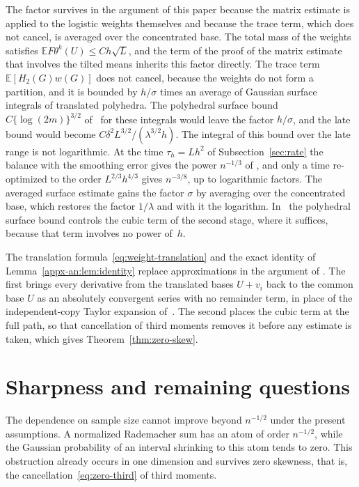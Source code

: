 \documentclass[11pt,letterpaper]{article}
\newif\ifshowlin
\newcommand{\lin}[1]{\ifshowlin{\color{revblue}%
\hypersetup{linkcolor=revblue,citecolor=revblue,urlcolor=revblue}#1}\else#1\fi}
\newif\ifshowskill
\newcommand{\skl}[1]{\ifshowskill{\color{revblue}%
\hypersetup{linkcolor=revblue,citecolor=revblue,urlcolor=revblue}#1}\else#1\fi}
\newif\ifshownat
\newcommand{\nat}[1]{\ifshownat{\color{revblue}%
\hypersetup{linkcolor=revblue,citecolor=revblue,urlcolor=revblue}#1}\else#1\fi}
\theoremstyle{remark}
\newcommand{\E}{\mathbb E}
\newcommand{\Hh}{H_2}
\begin{document}
{\skl{The factor survives in \nat{the argument of this paper} because the matrix estimate is
applied to the logistic weights themselves and because the trace term,
which does not cancel, is averaged over the concentrated base. The total
mass of the weights satisfies} \(\E F\theta^k(U)\le Ch\sqrt L\), and the term of \skl{the
proof of the matrix estimate} that involves
the tilted means inherits this factor directly. \skl{The} trace term
\(\E[\Hh(G)w(G)]\) does not cancel, because the weights do not form a
partition, and it is bounded by \(h/\sigma\) times an average of Gaussian
surface integrals of translated polyhedra. \nat{The polyhedral surface bound} \(C\{\log(2m)\}^{3/2}\) \nat{of}~\cite[Proposition~4]{GaoZhang}
for these integrals would leave the factor \(h/\sigma\), and the late
bound would become \(C\delta^2L^{3/2}/(\lambda^{3/2}h)\). The integral of
this bound \skl{over the late range} is not logarithmic\skl{. At the time
\(\tau_h=Lh^2\) of Subsection~\ref{sec:rate} the balance with the
smoothing error gives the power \(n^{-1/3}\) of \nat{\cite{GaoZhang}}, and only a
time re-optimized to the order \(L^{2/3}h^{4/3}\) gives \(n^{-3/8}\), up to
logarithmic factors.} The averaged surface estimate gains the factor \(\sigma\) by averaging over
the concentrated base, which restores the factor \(1/\lambda\) and with
it the logarithm. \nat{In~\cite[eq.~(19)]{GaoZhang} the polyhedral surface bound controls the cubic term of the second stage}, where it suffices,
because that term involves no power of~\(h\).

\lin{The translation formula~\eqref{eq:weight-translation} and the
exact identity of Lemma~\ref{appx-an:lem:identity} replace
approximations in the argument of \nat{\cite{GaoZhang}}. The first brings every
derivative from the translated bases \(U+v_i\) back to the common base
\(U\) as an absolutely convergent series with no remainder term, in place of \nat{the independent-copy Taylor expansion of}~\cite[Lemmas~19 and~23]{GaoZhang}. The second places the cubic
term at the full path, so that cancellation of third moments removes it
before any estimate is taken, which gives
Theorem~\ref{thm:zero-skew}.}}


\section{Sharpness and remaining questions}\label{opt:section}
The dependence on sample size cannot improve beyond \(n^{-1/2}\)
under the present assumptions. A normalized Rademacher sum has an atom
of order \(n^{-1/2}\), while the Gaussian probability of an interval
shrinking to this atom tends to zero. This obstruction already occurs
in one dimension and survives zero skewness\lin{, that is, the
cancellation~\eqref{eq:zero-third} of third moments}.
\end{document}
